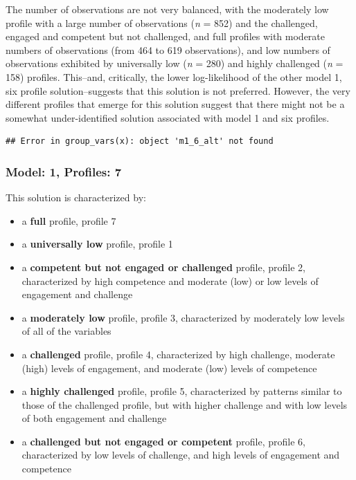 \documentclass[]{book}
\providecommand{\tightlist}{%
  \setlength{\itemsep}{0pt}\setlength{\parskip}{0pt}}
\theoremstyle{definition}
\theoremstyle{definition}
\theoremstyle{definition}
\theoremstyle{remark}
\begin{document}
The number of observations are not very balanced, with the moderately
low profile with a large number of observations (\emph{n} = 852) and the
challenged, engaged and competent but not challenged, and full profiles
with moderate numbers of observations (from 464 to 619 observations),
and low numbers of observations exhibited by universally low (\emph{n} =
280) and highly challenged (\emph{n} = 158) profiles. This--and,
critically, the lower log-likelihood of the other model 1, six profile
solution--suggests that this solution is not preferred. However, the
very different profiles that emerge for this solution suggest that there
might not be a somewhat under-identified solution associated with model
1 and six profiles.

\begin{verbatim}
## Error in group_vars(x): object 'm1_6_alt' not found
\end{verbatim}

\subsubsection{Model: 1, Profiles: 7}\label{model-1-profiles-7}

This solution is characterized by:

\begin{itemize}
\tightlist
\item
  a \textbf{full} profile, profile 7
\item
  a \textbf{universally low} profile, profile 1
\item
  a \textbf{competent but not engaged or challenged} profile, profile 2,
  characterized by high competence and moderate (low) or low levels of
  engagement and challenge
\item
  a \textbf{moderately low} profile, profile 3, characterized by
  moderately low levels of all of the variables
\item
  a \textbf{challenged} profile, profile 4, characterized by high
  challenge, moderate (high) levels of engagement, and moderate (low)
  levels of competence
\item
  a \textbf{highly challenged} profile, profile 5, characterized by
  patterns similar to those of the challenged profile, but with higher
  challenge and with low levels of both engagement and challenge
\item
  a \textbf{challenged but not engaged or competent} profile, profile 6,
  characterized by low levels of challenge, and high levels of
  engagement and competence
\end{itemize}
\end{document}
